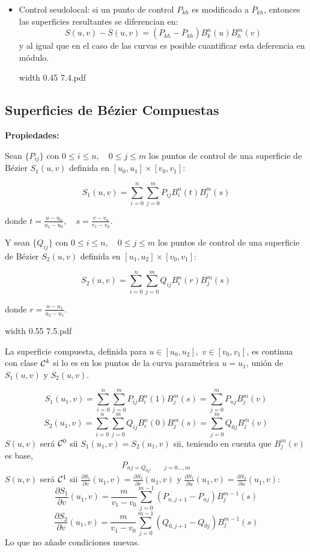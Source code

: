 \documentclass[twoside]{report}
\newcommand{\colocapdf}[2]{\quad\pdfimage width #2 {#1.pdf}}
\begin{document}
\begin{itemize}
\item Control seudolocal: si un punto de control $P_{kh}$ es modificado a $\overline{P}_{kh}$, entonces las superficies resultantes se diferencian en:
    $$S(u,v)-\overline{S}(u,v)=(P_{kh}-\overline{P}_{kh})B_k^n(u)B_h^m(v)$$
    y al igual que en el caso de las curvas es posible cuantificar esta deferencia en m\'{o}dulo.

\begin{center}
\colocapdf{7.4}{0.45\textwidth}
\end{center}
\end{itemize}

\subsection{Superficies de B\'{e}zier Compuestas}

{\bf Propiedades:}

Sean $\{P_{ij}\}$ con $0\leq i\leq n,\quad 0\leq j\leq m$ los puntos de control de una superficie de B\'{e}zier $S_1(u,v)$ definida en $[u_0,u_1] \times [v_0,v_1]$:

$$S_1(u,v)=\sum_{i=0}^n \sum_{j=0}^m P_{ij} B_i^n(t) B_j^m(s)$$

donde $t=\frac{u-u_0}{u_1-u_0},\quad s=\frac{v-v_0}{v_1-v_0}$.

\vspace{0.2cm}

Y sean $\{Q_{ij}\}$ con $0\leq i\leq n,\quad 0\leq j\leq m$ los puntos de control de una superficie de B\'{e}zier $S_2(u,v)$ definida en $[u_1,u_2] \times [v_0,v_1]$:

$$S_2(u,v)= \sum_{i=0}^n \sum_{j=0}^m Q_{ij} B_i^n(r) B_j^m(s)$$

donde $r=\frac{u-u_1}{u_2-u_1}.$

\begin{center}
\colocapdf{7.5}{0.55\textwidth}
\end{center}

La superficie compuesta, definida para $u\in [u_0,u_2],$ \quad $v\in [v_0,v_1]$, es continua con clase ${\cal C}^k$ si lo es en los puntos de la curva param\'{e}trica $u=u_1$, uni\'{o}n de $S_1(u,v)$ y $S_2(u,v)$.

$$S_1(u_1,v)= \sum_{i=0}^n \sum_{j=0}^m P_{ij} B_i^n(1) B_j^m(s)=\sum_{j=0}^m P_{nj} B_j^m(v)$$
$$S_2(u_1,v)= \sum_{i=0}^n \sum_{j=0}^m Q_{ij} B_i^n(0) B_j^m(s)= \sum_{j=0}^m Q_{0j} B_j^m (v)$$
$S(u,v)$ ser\'{a} ${\cal C}^0$ sii $S_1(u_1,v)=S_2(u_1,v)$ sii, teniendo en cuenta que $B_j^m(v)$ es base,
$$P_{nj=Q_{0j},\quad \quad j=0\ldots,m}$$
$S(u,v)$ ser\'{a} ${\cal C}^1$ sii $\frac{\partial S_1}{\partial v} (u_1,v)=\frac{\partial S_2}{\partial v}(u_1,v)$  y $\frac{\partial S_1}{\partial u} (u_1,v)=\frac{\partial S_2}{\partial u}(u_1,v)$:
$$\frac{\partial S_1}{\partial v}(u_1,v)= \frac{m}{v_1-v_0} \sum_{j=0}^{m-1} (P_{n,j+1}-P_{nj}) B_j^{m-1}(s)$$
$$\frac{\partial S_2}{\partial v}(u_1,v)= \frac{m}{v_1-v_0} \sum_{j=0}^{m-1} (Q_{0,j+1}-Q_{0j}) B_j^{m-1}(s)$$
Lo que no a\~{n}ade condiciones nuevas.
\end{document}
